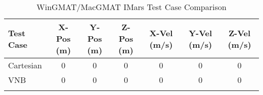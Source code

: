 \begin{table}[htbp!]
\centering
\caption{ WinGMAT/MacGMAT IMars Test Case Comparison}
      \begin{tabular}{lcccccc}
      \hline\hline
          Test Case & X-Pos (m) & Y-Pos (m) & Z-Pos (m) & X-Vel (m/s) & Y-Vel (m/s) & Z-Vel (m/s) \\
         \hline
         Cartesian & 0 & 0 & 0 & 0 & 0 & 0 \\
         VNB & 0 & 0 & 0 & 0 & 0 & 0 \\
      \hline\hline
      \label{Table: IMars WinGMAT-MacGMAT Table} 
\end{tabular}
\end{table}
